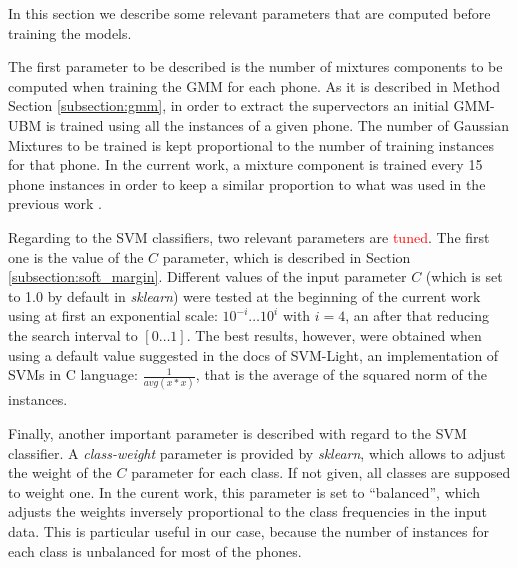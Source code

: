 In this section we describe some relevant parameters that are computed before training the
models.

The first parameter to be described is the number of mixtures components
to be computed when training the GMM for each phone. As it is described in Method Section
\ref{subsection:gmm}, in order to extract the supervectors an initial GMM-UBM is trained
using all the instances of a given phone.
The number of Gaussian Mixtures to be trained is kept proportional to the number of
training instances for that phone. In the current work, a
mixture component is trained every 15 phone instances
in order to keep a similar proportion to what was used in the previous work \cite{main} .

Regarding to the SVM classifiers, two relevant parameters are \textcolor{red}{tuned}.
The first one is
the value of the $C$ parameter, which is described in Section
\ref{subsection:soft_margin}.
Different values of the input parameter $C$ (which is set to 1.0 by default
in \textit{sklearn})
were tested at the beginning of the
current work using at first an exponential scale:
$10^{-i} \ldots 10^{i}$ with $i=4$, an after that reducing the search interval to
$[0 \ldots 1]$. The best results, however, were obtained when using a default value
suggested in the docs of SVM-Light, an implementation of SVMs in C language: $\frac{1}{avg(x*x)}$,
that is the average of the squared norm of the instances.

Finally, another important parameter is described with regard to the SVM classifier.
A \textit{class-weight} parameter is provided by \textit{sklearn}, which allows to
adjust the weight of the $C$ parameter for each class. If not given, all classes are supposed
to weight one. In the curent work, this parameter is set to ``balanced'', which adjusts
the weights inversely proportional to the class frequencies in the input data.
This is particular useful in our case, because the number of instances for each class is
unbalanced for most of the phones.


